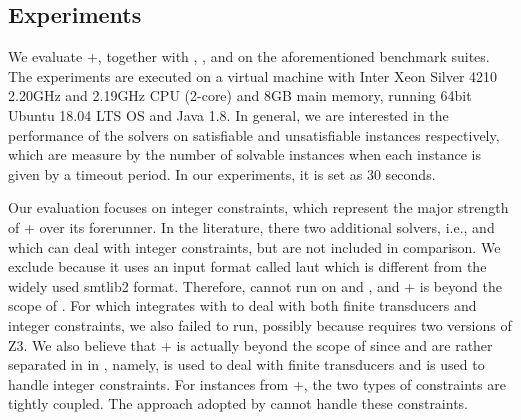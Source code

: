 \subsection{Experiments}\label{sec:exp-res}

We evaluate {\ostrich}+, together with {\cvc} \cite{cvc4}, {\zthree} \cite{Z3-str}, and {\zthreetrau} \cite{Z3-trau} on the aforementioned benchmark suites. 
The experiments are executed on a virtual machine with Inter Xeon Silver 4210 2.20GHz and 2.19GHz CPU (2-core) and 8GB main memory, running 64bit Ubuntu 18.04 LTS OS and Java 1.8. In general, we are interested in the performance of the solvers on satisfiable and unsatisfiable instances respectively, which are measure by the number of solvable instances  when each instance is given by a timeout period. In our experiments, it is set as 30 seconds. %

Our evaluation focuses on integer constraints, which represent the major strength of {\ostrich}+ over its forerunner. In the literature, there two additional solvers, i.e., {\slent} and  {\trauplus} which can deal with integer constraints, but are not included in comparison.  We exclude {\slent} because it uses an input format called laut which is different from the widely used smtlib2 format. Therefore, %
{\slent} cannot run on {\kaluzabench} and {\pyexbench}, and {\transducerbench}+ is beyond the scope of {\slent}.  
%
For {\trauplus} which integrates {\trau} with {\sloth} to deal with both finite transducers and integer constraints, we also failed to run, possibly because {\trau} requires two versions of Z3.  We also believe that {\transducerbench}+ is actually beyond the scope of {\trauplus} since   {\trau} and {\sloth} are rather separated in in {\trauplus}, namely, {\sloth} is used to deal with finite transducers and {\trau} is used to handle integer constraints. For instances from {\transducerbench}+, the two types of constraints are tightly coupled. The approach adopted by {\trauplus} cannot handle these constraints. %


